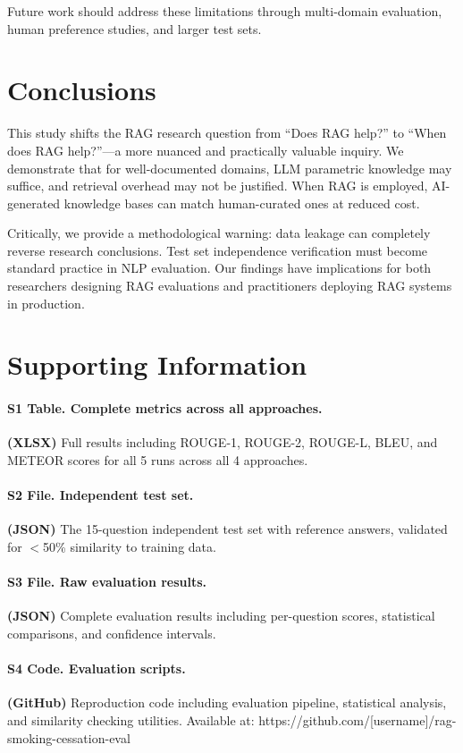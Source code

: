 \documentclass[10pt,letterpaper]{article}
\begin{document}
Future work should address these limitations through multi-domain evaluation, human preference studies, and larger test sets.

\section*{Conclusions}
This study shifts the RAG research question from ``Does RAG help?'' to ``When does RAG help?''—a more nuanced and practically valuable inquiry. We demonstrate that for well-documented domains, LLM parametric knowledge may suffice, and retrieval overhead may not be justified. When RAG is employed, AI-generated knowledge bases can match human-curated ones at reduced cost.

Critically, we provide a methodological warning: data leakage can completely reverse research conclusions. Test set independence verification must become standard practice in NLP evaluation. Our findings have implications for both researchers designing RAG evaluations and practitioners deploying RAG systems in production.

\section*{Supporting Information}

\paragraph*{S1 Table. Complete metrics across all approaches.}
\textbf{(XLSX)} Full results including ROUGE-1, ROUGE-2, ROUGE-L, BLEU, and METEOR scores for all 5 runs across all 4 approaches.

\paragraph*{S2 File. Independent test set.}
\textbf{(JSON)} The 15-question independent test set with reference answers, validated for $<$50\% similarity to training data.

\paragraph*{S3 File. Raw evaluation results.}
\textbf{(JSON)} Complete evaluation results including per-question scores, statistical comparisons, and confidence intervals.

\paragraph*{S4 Code. Evaluation scripts.}
\textbf{(GitHub)} Reproduction code including evaluation pipeline, statistical analysis, and similarity checking utilities. Available at: https://github.com/[username]/rag-smoking-cessation-eval
\end{document}
